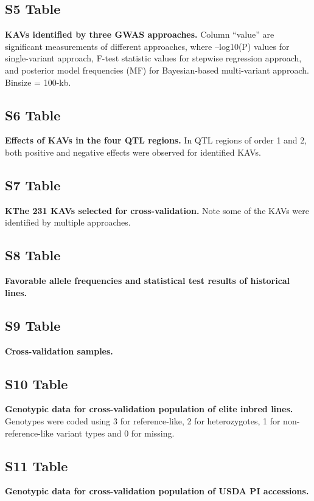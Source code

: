 \documentclass[10pt,letterpaper]{article}
\begin{document}
\subsection*{S5 Table}
\label{Table_S5}
{\bf KAVs identified by three GWAS approaches.} Column “value” are significant measurements of different approaches, where –log10(P) values for single-variant approach, F-test statistic values for stepwise regression approach, and posterior model frequencies (MF) for Bayesian-based multi-variant approach. Binsize  = 100-kb.

\subsection*{S6 Table}
\label{Table_S6}
{\bf Effects of KAVs in the four QTL regions.} In QTL regions of order 1 and 2, both positive and negative effects were observed for identified KAVs. 

\subsection*{S7 Table}
\label{Table_S7}
{\bf KThe 231 KAVs selected for cross-validation.} Note some of the KAVs were identified by multiple approaches. 

\subsection*{S8 Table}
\label{Table_S8}
{\bf Favorable allele frequencies and statistical test results of historical lines. }

\subsection*{S9 Table}
\label{Table_S9}
{\bf Cross-validation samples.}

\subsection*{S10 Table}
\label{Table_S10}
{\bf Genotypic data for cross-validation population of elite inbred lines.} Genotypes were coded using 3 for reference-like, 2 for heterozygotes, 1 for non-reference-like variant types and 0 for missing.

\subsection*{S11 Table}
\label{Table_S11}
{\bf Genotypic data for cross-validation population of USDA PI accessions.}
\end{document}

